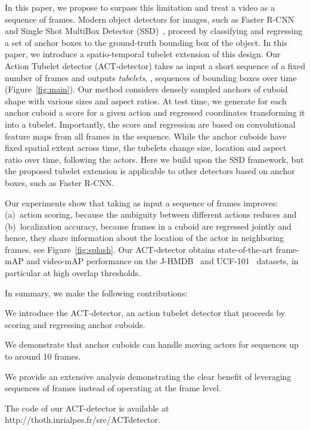 \documentclass[10pt,twocolumn,letterpaper]{article}
\begin{document}
In this paper, we propose to surpass this limitation and treat a video as a sequence of frames.  
Modern object detectors for images, such as Faster R-CNN~\cite{ren15nips} and Single Shot MultiBox Detector (SSD)~\cite{liu16eccv}, proceed by classifying and regressing a set of anchor boxes to the ground-truth bounding box of the object. 
In this paper, we introduce a spatio-temporal tubelet extension of this design. 
Our Action Tubelet detector (ACT-detector) takes as input a short sequence of a fixed number of frames and outputs \textit{tubelets}, \ie, sequences of bounding boxes over time (Figure~\ref{fig:main}). Our method considers densely sampled anchors of cuboid shape with various sizes and aspect ratios. 
At test time, we generate for each anchor cuboid a score for a given action and regressed coordinates transforming it into a tubelet. 
Importantly, the score and regression are based on convolutional feature maps from all frames in the sequence. 
While the anchor cuboids have fixed spatial extent across time, the tubelets change size, location and aspect ratio over time, following the actors. Here we build upon the SSD framework, but the proposed tubelet extension is applicable to other detectors based on anchor boxes, such as Faster R-CNN.

Our experiments show that taking as input a sequence of frames improves: (a)~action scoring, because the ambiguity between different actions reduces and (b)~localization accuracy, because frames in a cuboid are regressed jointly and hence, they share information about the location of the actor in neighboring frames, see Figure~\ref{fig:splash}. 
Our ACT-detector obtains state-of-the-art frame-mAP and video-mAP performance on the J-HMDB~\cite{jhmdb} and UCF-101~\cite{ucf101} datasets, in particular at high overlap thresholds. 

\noindent In summary, we make the following contributions:

\noindent  We introduce the ACT-detector, an action tubelet detector that proceeds by scoring and regressing anchor cuboids.

\noindent  We demonstrate that anchor cuboids can handle moving actors for sequences up to around 10 frames. 

\noindent  We provide an extensive analysis demonstrating the clear benefit of leveraging sequences of frames instead of operating at the frame level. 



The code of our ACT-detector is available at http://thoth.inrialpes.fr/src/ACTdetector.
\end{document}
